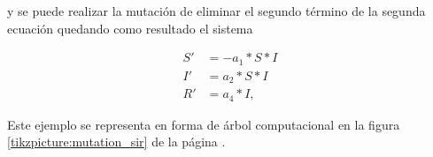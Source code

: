 y se puede realizar la mutación de eliminar el segundo término de la segunda ecuación quedando como resultado el sistema

\begin{align*}
    S' & = - a_1 * S * I \\
    I' & = a_2 * S * I   \\
    R' & = a_4 * I,
\end{align*}

Este ejemplo se representa en forma de árbol computacional en la figura \ref{tikzpicture:mutation_sir} de la página \pageref{tikzpicture:mutation_sir}.

\begin{center}




\end{center}
